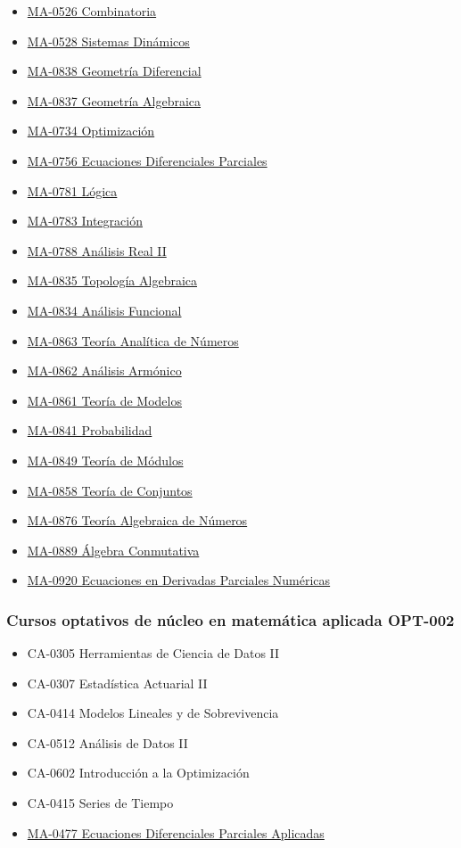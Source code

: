 \begin{itemize}
    \item \hyperlink{MA0526}{MA-0526 Combinatoria}
    \item \hyperlink{MA0528}{MA-0528 Sistemas Dinámicos}
    \item \hyperlink{MA0838}{MA-0838 Geometría Diferencial}
    \item \hyperlink{MA0837}{MA-0837 Geometría Algebraica}
    \item \hyperlink{MA0734}{MA-0734 Optimización}
    \item \hyperlink{MA0756}{MA-0756 Ecuaciones Diferenciales Parciales}
    \item \hyperlink{MA0781}{MA-0781 Lógica}
    \item \hyperlink{MA0783}{MA-0783 Integración}
    \item \hyperlink{MA0788}{MA-0788 Análisis Real II}
    \item \hyperlink{MA0835}{MA-0835 Topología Algebraica}
    \item \hyperlink{MA0834}{MA-0834 Análisis Funcional}
    \item \hyperlink{MA0863}{MA-0863 Teoría Analítica de Números}
    \item \hyperlink{MA0862}{MA-0862 Análisis Armónico}
    \item \hyperlink{MA0861}{MA-0861 Teoría de Modelos}
    \item \hyperlink{MA0841}{MA-0841 Probabilidad}
    \item \hyperlink{MA0849}{MA-0849 Teoría de Módulos}
    \item \hyperlink{MA0858}{MA-0858 Teoría de Conjuntos}
    \item \hyperlink{MA0876}{MA-0876 Teoría Algebraica de Números}
    \item \hyperlink{MA0889}{MA-0889 Álgebra Conmutativa}
    \item \hyperlink{MA0920}{MA-0920 Ecuaciones en Derivadas Parciales Numéricas}
\end{itemize}

\subsubsection*{Cursos optativos de núcleo en matemática aplicada OPT-002}
\begin{itemize}
    \item {CA-0305 Herramientas de Ciencia de Datos II}
    \item {CA-0307 Estadística Actuarial II}
    \item {CA-0414 Modelos Lineales y de Sobrevivencia}
    \item {CA-0512 Análisis de Datos II}
    \item {CA-0602 Introducción a la Optimización}
    \item {CA-0415 Series de Tiempo}
    \item \hyperlink{MA0477}{MA-0477 Ecuaciones Diferenciales Parciales Aplicadas}
\end{itemize}

